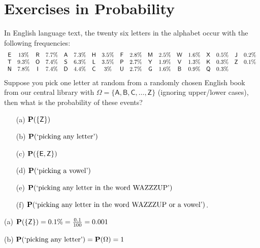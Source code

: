 \section{Exercises in Probability}\label{S:xsProbability}
\begin{ExerciseList}
\Exercise
{In English language text, the twenty six letters in the alphabet occur with the following frequencies:
{\footnotesize $$
\mathsf{
\begin{array}{cccccccccccccccccc}
\sf E   &       13      \%&     \sf R   &       7.7     \%&     \sf A   &       7.3     \%&     \sf H   &       3.5     \%&     \sf F   &       2.8     \%&     \sf M    &      2.5     \%&     \sf W   &       1.6     \%&     \sf X   &       0.5     \%&     \sf J   &       0.2     \%\\
\sf T   &       9.3     \%&     \sf O   &       7.4     \%&     \sf S   &       6.3     \%&     \sf L   &       3.5     \%&     \sf P   &       2.7     \%&     \sf Y    &      1.9     \%&     \sf V   &       1.3     \%&     \sf K   &       0.3     \%&     \sf Z   &       0.1     \%\\
\sf N   &       7.8     \%&     \sf I   &       7.4     \%&     \sf D   &       4.4     \%&     \sf C   &       3       \%&     \sf U   &       2.7     \%&     \sf G    &      1.6     \%&     \sf B   &       0.9     \%&     \sf Q   &       0.3     \%&             &               \\
\end{array}
}
$$}
Suppose you pick one letter at random from a randomly chosen English
book from our central library with
$\Omega=\{\mathsf{A,B,C,\ldots,Z}\}$ (ignoring upper/lower cases),
then what is the probability of these events?
\begin{itemize}
\item[(a)]$\mathbf{P}(\{\mathsf{Z}\})$
\item[(b)]$\mathbf{P}(\textrm{`picking any letter'})$
\item[(c)] $\mathbf{P}(\{\mathsf{E},\mathsf{Z}\})$
\item[(d)]$\mathbf{P}(\textrm{`picking a vowel'})$
\item[(e)]$\mathbf{P}(\textrm{`picking any letter in the word WAZZZUP'})$
\item[(f)]$\mathbf{P}(\textrm{`picking any letter in the word WAZZZUP or a vowel'})$.
\end{itemize}
}
\label{Ex:RandomEnglishLetter}
\Answer
{\bit
\item[(a)] $\mathbf{P}(\{\mathsf{Z}\})=0.1\%=\frac{0.1}{100}=0.001$
\item[(b)] $\mathbf{P}(\textrm{`picking any letter'})= \mathbf{P}(\Omega) = 1$
}
\end{ExerciseList}
